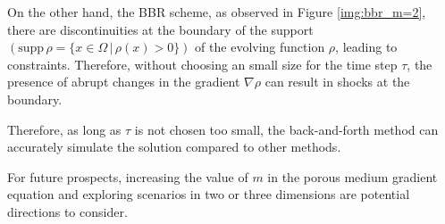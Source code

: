 \documentclass[a4,10.5pt, twocolumn, dvipdfmx]{article}
\theoremstyle{definition}
\begin{document}
On the other hand, the BBR scheme, as observed in Figure \ref{img:bbr_m=2}, there are discontinuities at the boundary of the support $(\text{supp} \, \rho = \{ x \in \Omega \,| \, \rho(x) > 0\})$ of the evolving function $\rho$, leading to constraints. 
Therefore, without choosing an small size for the time step $\tau$, the presence of abrupt changes in the gradient $\nabla\rho$ can result in shocks at the boundary.

Therefore, as long as $\tau$ is not chosen too small, the back-and-forth method can accurately simulate the solution compared to other methods.

For future prospects, increasing the value of $m$ in the porous medium gradient equation and exploring scenarios in two or three dimensions are potential directions to consider.

\end{document}
